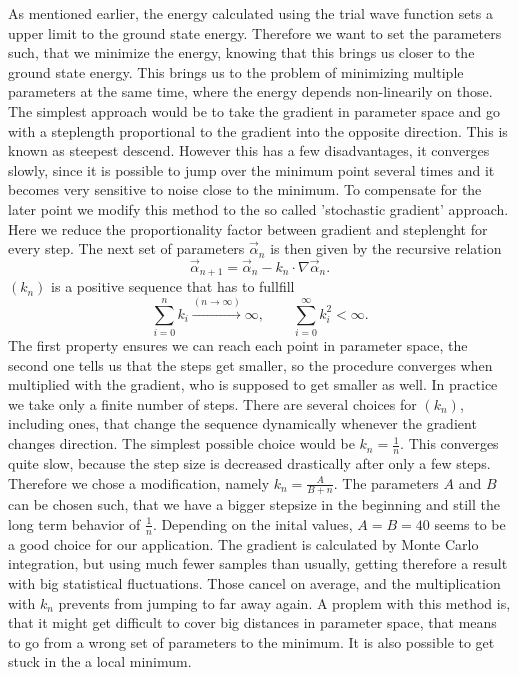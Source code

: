 \documentclass[a4paper,10pt]{article}
\begin{document}
As mentioned earlier, the energy calculated using the trial wave function sets a upper limit to the ground state energy.
Therefore we want to set the parameters such, that we minimize the energy, knowing that this brings us closer to the ground state energy. 
This brings us to the problem of minimizing multiple parameters at the same time, where the energy depends non-linearily on those.
The simplest approach would be to take the gradient in parameter space and go with a steplength proportional to 
the gradient into the opposite direction. This is known as steepest descend. However this has a few disadvantages, it converges slowly, since it is possible 
to jump over the minimum point several times and it becomes very sensitive to noise close to the minimum. 
To compensate for the later point we modify this method to the so called 'stochastic gradient' approach. 
Here we reduce the proportionality factor between gradient and steplenght for every step.
The next set of parameters $\vec{\alpha}_n$ is then given by the recursive relation
\begin{equation}
 \vec{\alpha}_{n+1} = \vec{\alpha}_n - k_n\cdot \nabla \vec{\alpha}_n.
\end{equation}
$(k_n)$ is a positive sequence that has to fullfill
\begin{equation}
 \sum_{i=0}^n k_i \stackrel{(n \rightarrow \infty)}{\longrightarrow} \infty , \quad\quad \sum_{i=0}^{\infty} k_i^2 < \infty.
\end{equation}
The first property ensures we can reach each point in parameter space, the second one tells us that the steps get smaller, so the procedure converges
when multiplied with the gradient, who is supposed to get smaller as well. 
In practice we take only a finite number of steps. There are several choices for $(k_n)$, including ones, that change the sequence dynamically whenever the gradient changes 
direction. 
The simplest possible choice would be $k_n=\frac{1}{n}$.
This converges quite slow, because the step size is decreased drastically after only a few steps. 
Therefore we chose a modification, namely $k_n=\frac{A}{B+n}$. The parameters $A$ and $B$ can be chosen such,
that we have a bigger stepsize in the beginning and still the long term behavior of $\frac1n$. Depending on the inital values,
$A=B=40$ seems to be a good choice for our application.
The gradient is calculated by Monte Carlo integration, but using much fewer samples than usually, getting therefore a result with big statistical fluctuations. 
Those  cancel on average, and the multiplication with $k_n$ prevents from jumping to far away again. 
A proplem with this method is, that it might get difficult to cover big distances in parameter space, that means 
to go from a wrong set of parameters to the minimum. It is also possible to get stuck in the a local minimum. 
\end{document}
